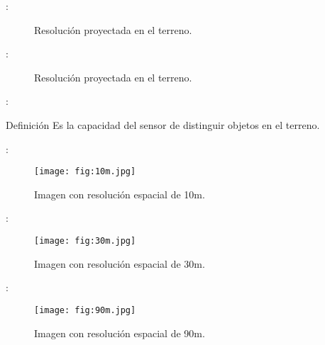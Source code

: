 \begin{frame}{\secname : \subsecname}
  \begin{figure}
    \centering
    \caption{Resolución proyectada en el terreno.}
    \label{}
  \end{figure}
\end{frame}

\begin{frame}{\secname : \subsecname}
  \begin{figure}
    \centering
    \caption{Resolución proyectada en el terreno.}
    \label{}
  \end{figure}
\end{frame}

\begin{frame}{\secname : \subsecname}
    \begin{block}{Definición}
        Es la capacidad del sensor de distinguir objetos en el terreno.
    \end{block}
\end{frame}

\begin{frame}{\secname : \subsecname}
    \begin{figure}[h!]
        \centering
        \texttt{[image: fig:10m.jpg]}
        \caption{Imagen con resolución espacial de 10m.}
    \end{figure}
\end{frame}

\begin{frame}{\secname : \subsecname}
    \begin{figure}[h!]
        \centering
        \texttt{[image: fig:30m.jpg]}
        \caption{Imagen con resolución espacial de 30m.}
    \end{figure}
\end{frame}

\begin{frame}{\secname : \subsecname}
    \begin{figure}[h!]
        \centering
        \texttt{[image: fig:90m.jpg]}
        \caption{Imagen con resolución espacial de 90m.}
    \end{figure}
\end{frame}

